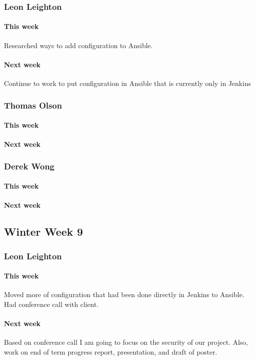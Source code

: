 \documentclass[10pt,letterpaper,onecolumn,draftclsnofoot]{IEEEtran}
\begin{document}
\subsubsection{Leon Leighton}
\paragraph{This week}Researched ways to add configuration to Ansible.
\paragraph{Next week}Continue to work to put configuration in Ansible that is currently only in Jenkins


\subsubsection{Thomas Olson}
\paragraph{This week}
\paragraph{Next week}


\subsubsection{Derek Wong}
\paragraph{This week}
\paragraph{Next week}


\subsection{Winter Week 9}
\subsubsection{Leon Leighton}
\paragraph{This week}Moved more of configuration that had been done directly in Jenkins to Ansible.  
Had conference call with client.
\paragraph{Next week} Based on conference call I am going to focus on the security of our project.  
Also, work on end of term progress report, presentation, and draft of poster.
\end{document}
